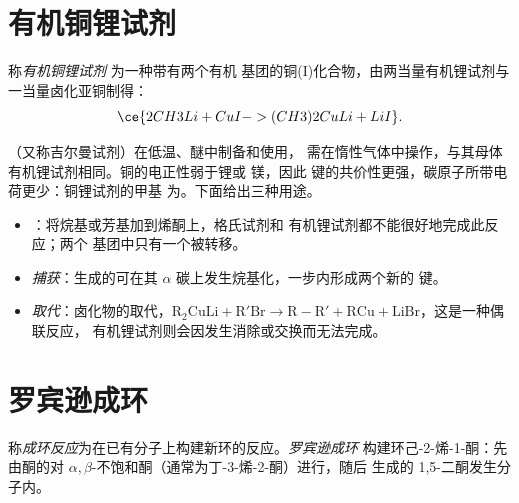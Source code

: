 \section{有机铜锂试剂}

\begin{definition}[有机铜锂试剂]\label{def:b2:conjugate-additions:cuprate}
称\emph{有机铜锂试剂}  为一种带有两个有机
基团的铜(I)化合物，由两当量有机锂试剂与一当量卤化亚铜制得：
\begin{equation*}
\ce{2 CH3Li + CuI -> (CH3)2CuLi + LiI}.
\end{equation*}
\end{definition}

（又称吉尔曼试剂）在低温、醚中制备和使用，
需在惰性气体中操作，与其母体有机锂试剂相同。铜的电正性弱于锂或
镁，因此  键的共价性更强，碳原子所带电荷更少：铜锂试剂的甲基
为。下面给出三种用途。

\begin{itemize}
  \item \emph{}：将烷基或芳基加到烯酮上，格氏试剂和
        有机锂试剂都不能很好地完成此反应；两个  基团中只有一个被转移。
  \item \emph{捕获}：生成的可在其 $\alpha$
        碳上发生烷基化，一步内形成两个新的  键。
  \item \emph{取代}：卤化物的取代，$\mathrm{R_2CuLi + R'Br \to R{-}R' + RCu + LiBr}$，这是一种偶联反应，
        有机锂试剂则会因发生消除或交换而无法完成。
\end{itemize}

\section{罗宾逊成环}

\begin{definition}[成环反应]\label{def:b2:conjugate-additions:robinson}
称\emph{成环反应}为在已有分子上构建新环的反应。\emph{罗宾逊成环}
构建环己-2-烯-1-酮：先由酮的对
$\alpha,\beta$-不饱和酮（通常为丁-3-烯-2-酮）进行，随后
生成的 1,5-二酮发生分子内。
\end{definition}

